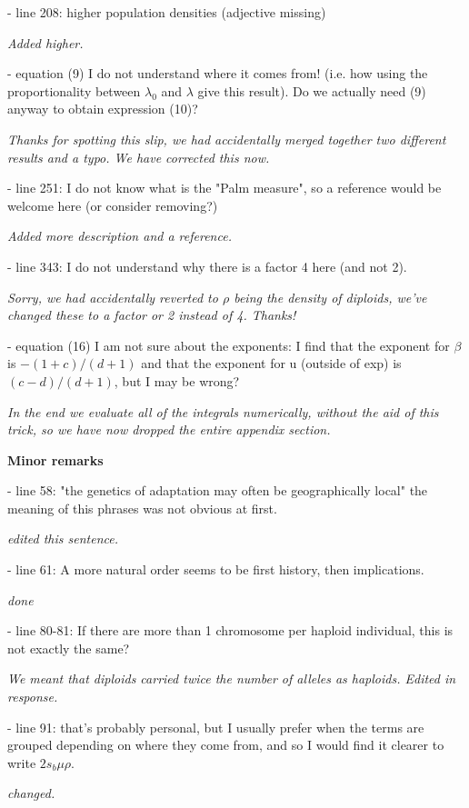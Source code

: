 \documentclass[12pt,letterpaper]{article}
\newcommand{\response}[1]{\emph{ \color{blue} #1}}
\begin{document}
- line 208: higher population densities (adjective missing)

\response{Added higher.}

- equation (9) I do not understand where it comes from! (i.e. how using the proportionality between $\lambda_0$ and $\lambda$ give this result). Do we actually need (9) anyway to obtain expression (10)?

\response{Thanks for spotting this slip, we had accidentally merged together two different results and a typo. We have corrected this now.}

- line 251: I do not know what is the "Palm measure", so a reference would be welcome here (or consider removing?)

\response{Added more description and a reference.}

- line 343: I do not understand why there is a factor 4 here (and not 2).

\response{Sorry, we had accidentally reverted to $\rho$ being the density of diploids, we've changed these to a factor or 2 instead of 4. Thanks! }

- equation (16) I am not sure about the exponents: I find that the exponent for $\beta$ is $-(1+c)/(d+1)$ and that the exponent for u (outside of exp) is $(c-d)/(d+1)$, but I may be wrong?

\response{In the end we evaluate all of the integrals numerically, without the aid of this trick, so we have now dropped the entire appendix section.}

\textbf{Minor remarks}

- line 58: "the genetics of adaptation may often be geographically local" the meaning of this phrases was not obvious at first.

\response{edited this sentence.}

- line 61: A more natural order seems to be first history, then implications.

\response{done}

- line 80-81: If there are more than 1 chromosome per haploid individual, this is not exactly the same?

\response{We meant that diploids carried twice the number of alleles as haploids. Edited in response.}

- line 91: that's probably personal, but I usually prefer when the terms are grouped depending on where they come from, and so I would find it clearer to write $2 s_b \mu \rho$.

\response{changed.}
\end{document}
